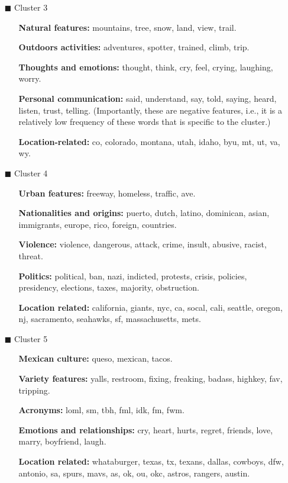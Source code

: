 \documentclass[../thesis.tex]{subfiles}
\begin{document}
\begin{itemize}
  \item[\color{tol3}$\blacksquare$] Cluster 3
  \begin{itemize}
    \item[] \textbf{Natural features:} mountains, tree, snow, land, view, trail.
    \item[] \textbf{Outdoors activities:} adventures, spotter, trained, climb, trip.
    \item[] \textbf{Thoughts and emotions:} thought, think, cry, feel, crying, laughing, worry.
    \item[] \textbf{Personal communication:} said, understand, say, told, saying, heard, listen, trust, telling. (Importantly, these are negative features, i.e., it is a relatively low frequency of these words that is specific to the cluster.)
    \item[] \textbf{Location-related:} co, colorado, montana, utah, idaho, byu, mt, ut, va, wy.
  \end{itemize}
  
  \item[\color{tol2}$\blacksquare$] Cluster 4
  \begin{itemize}
    \item[] \textbf{Urban features:} freeway, homeless, traffic, ave.
    \item[] \textbf{Nationalities and origins:} puerto, dutch, latino, dominican, asian, immigrants, europe, rico, foreign, countries.
    \item[] \textbf{Violence:} violence, dangerous, attack, crime, insult, abusive, racist, threat.
    \item[] \textbf{Politics:} political, ban, nazi, indicted, protests, crisis, policies, presidency, elections, taxes, majority, obstruction.
    \item[] \textbf{Location related:} california, giants, nyc, ca, socal, cali, seattle, oregon, nj, sacramento, seahawks, sf, massachusetts, mets.
  \end{itemize}
  
  \item[\color{tol5}$\blacksquare$] Cluster 5
  \begin{itemize}
    \item[] \textbf{Mexican culture:} queso, mexican, tacos.
    \item[] \textbf{Variety features:} yalls, restroom, fixing, freaking, badass, highkey, fav, tripping.
    \item[] \textbf{Acronyms:} loml, sm, tbh, fml, idk, fm, fwm.
    \item[] \textbf{Emotions and relationships:} cry, heart, hurts, regret, friends, love, marry, boyfriend, laugh.
    \item[] \textbf{Location related:} whataburger, texas, tx, texans, dallas, cowboys, dfw, antonio, sa, spurs, mavs, as, ok, ou, okc, astros, rangers, austin.
  \end{itemize}
\end{itemize}
\end{document}
